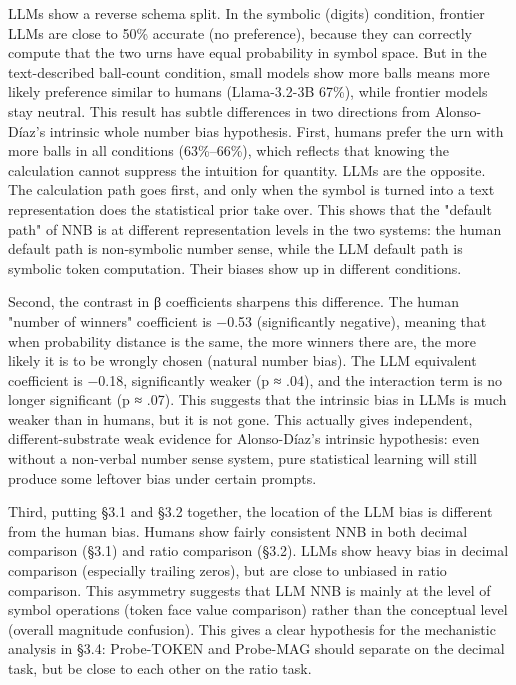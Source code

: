 LLMs show a reverse schema split. In the symbolic (digits) condition, frontier LLMs are close to 50\% accurate (no preference), because they can correctly compute that the two urns have equal probability in symbol space. But in the text-described ball-count condition, small models show more balls means more likely preference similar to humans (Llama-3.2-3B 67\%), while frontier models stay neutral. This result has subtle differences in two directions from Alonso-Díaz's intrinsic whole number bias hypothesis. First, humans prefer the urn with more balls in all conditions (63\%–66\%), which reflects that knowing the calculation cannot suppress the intuition for quantity. LLMs are the opposite. The calculation path goes first, and only when the symbol is turned into a text representation does the statistical prior take over. This shows that the "default path" of NNB is at different representation levels in the two systems: the human default path is non-symbolic number sense, while the LLM default path is symbolic token computation. Their biases show up in different conditions.

Second, the contrast in β coefficients sharpens this difference. The human "number of winners" coefficient is −0.53 (significantly negative), meaning that when probability distance is the same, the more winners there are, the more likely it is to be wrongly chosen (natural number bias). The LLM equivalent coefficient is −0.18, significantly weaker (p ≈ .04), and the interaction term is no longer significant (p ≈ .07). This suggests that the intrinsic bias in LLMs is much weaker than in humans, but it is not gone. This actually gives independent, different-substrate weak evidence for Alonso-Díaz's intrinsic hypothesis: even without a non-verbal number sense system, pure statistical learning will still produce some leftover bias under certain prompts.

Third, putting §3.1 and §3.2 together, the location of the LLM bias is different from the human bias. Humans show fairly consistent NNB in both decimal comparison (§3.1) and ratio comparison (§3.2). LLMs show heavy bias in decimal comparison (especially trailing zeros), but are close to unbiased in ratio comparison. This asymmetry suggests that LLM NNB is mainly at the level of symbol operations (token face value comparison) rather than the conceptual level (overall magnitude confusion). This gives a clear hypothesis for the mechanistic analysis in §3.4: Probe-TOKEN and Probe-MAG should separate on the decimal task, but be close to each other on the ratio task.

